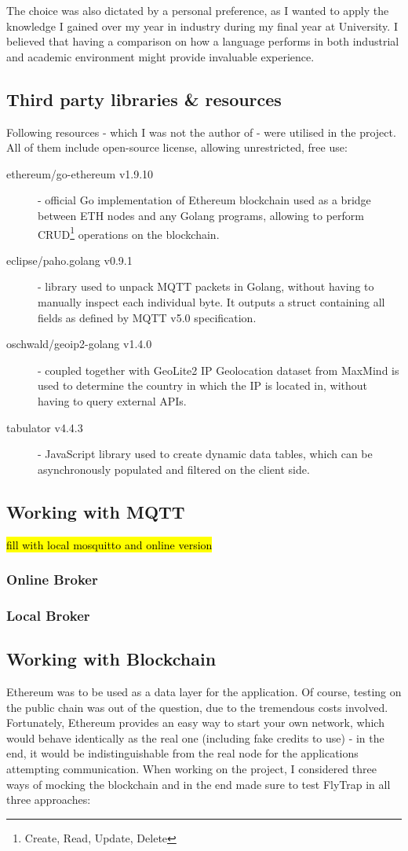The choice was also dictated by a personal preference, as I wanted to apply the knowledge I gained over my year in industry during my final year at University. I believed that having a comparison on how a language performs in both industrial and academic environment might provide invaluable experience.
\subsection{Third party libraries \& resources}\label{sec:tpp}
Following resources - which I was not the author of - were utilised in the project. All of them include open-source license, allowing unrestricted, free use:
\begin{description}
  \item[ethereum/go-ethereum v1.9.10] \cite{ethereum2017official} - official Go implementation of Ethereum blockchain used as a bridge between ETH nodes and any Golang programs, allowing to perform CRUD\footnote{Create, Read, Update, Delete} operations on the blockchain.
    \item[eclipse/paho.golang v0.9.1] \cite{pahogolang} - library used to unpack MQTT packets in Golang, without having to manually inspect each individual byte. It outputs a struct containing all fields as defined by MQTT v5.0 specification.
    \item[oschwald/geoip2-golang v1.4.0] \cite{geoip2} - coupled together with GeoLite2 IP Geolocation dataset from MaxMind \cite{maxmind} is used to determine the country in which the IP is located in, without having to query external APIs. 
    \item[tabulator v4.4.3] \cite{tabulator} - JavaScript library used to create dynamic data tables, which can be asynchronously populated and filtered on the client side.
\end{description}

\subsection{Working with MQTT}
\hl{fill with local mosquitto and online version}
\subsubsection{Online Broker}
\subsubsection{Local Broker}
\subsection{Working with Blockchain}
Ethereum was to be used as a data layer for the application. Of course, testing on the public chain was out of the question, due to the tremendous costs involved. Fortunately, Ethereum provides an easy way to start your own network, which would behave identically as the real one (including fake credits to use) - in the end, it would be indistinguishable from the real node for the applications attempting communication. When working on the project, I considered three ways of mocking the blockchain and in the end made sure to test FlyTrap in all three approaches:
